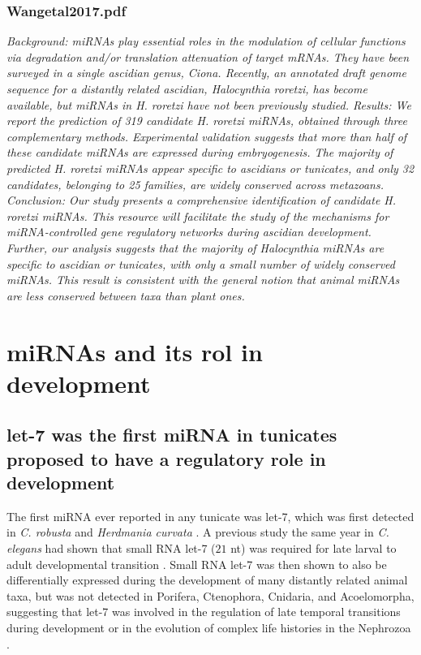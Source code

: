 \documentclass[graybox]{svmult}
\begin{document}
\subsubsection{Wangetal2017.pdf}
\cite{Wang2017}
\textit{Background: miRNAs play essential roles in the modulation of cellular functions via degradation and/or translation
attenuation of target mRNAs. They have been surveyed in a single ascidian genus, Ciona. Recently, an annotated
draft genome sequence for a distantly related ascidian, Halocynthia roretzi, has become available, but miRNAs in
H. roretzi have not been previously studied.
Results: We report the prediction of 319 candidate H. roretzi miRNAs, obtained through three complementary
methods. Experimental validation suggests that more than half of these candidate miRNAs are expressed during
embryogenesis. The majority of predicted H. roretzi miRNAs appear specific to ascidians or tunicates, and only 32
candidates, belonging to 25 families, are widely conserved across metazoans.
Conclusion: Our study presents a comprehensive identification of candidate H. roretzi miRNAs. This resource
will facilitate the study of the mechanisms for miRNA-controlled gene regulatory networks during ascidian
development. Further, our analysis suggests that the majority of Halocynthia miRNAs are specific to ascidian
or tunicates, with only a small number of widely conserved miRNAs. This result is consistent with the general
notion that animal miRNAs are less conserved between taxa than plant ones.}

\fi

\section{miRNAs and its rol in development}
\label{sec:3}

\subsection{let-7 was the first miRNA in tunicates proposed to have a regulatory 
role in development}
The first miRNA ever reported in any tunicate was let-7, which was 
first detected in \textit{C. robusta} and \textit{Herdmania curvata} 
\cite{Pasquinelli2000}. A previous study the same year in \textit{C. elegans} 
had shown that small RNA let-7 ($21$ nt) was required for late larval to adult 
developmental transition \cite{Reinhart:2000mz}. Small RNA let-7 was then shown 
to also be differentially expressed during the development of many distantly 
related animal taxa, but was not detected in Porifera, Ctenophora, Cnidaria, 
and Acoelomorpha, suggesting that let-7 was involved in the regulation of late 
temporal transitions during development or in the evolution of complex life 
histories in the Nephrozoa \cite{Pasquinelli2000, Pasquinelli2003}.
\end{document}
